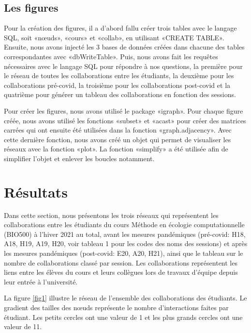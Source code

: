 \documentclass[12pt]{article}
\begin{document}
\subsection*{\small Les figures \vspace{-0.1cm}}
Pour la création des figures, il a d’abord fallu créer trois tables avec le langage SQL, soit «nœuds», «cours» et «collab», en utilisant «CREATE TABLE». Ensuite, nous avons injecté les 3 bases de données créées dans chacune des tables correspondantes avec «dbWriteTable». Puis, nous avons fait les requêtes nécessaires avec le langage SQL pour répondre à nos questions, la première pour le réseau de toutes les collaborations entre les étudiants, la deuxième pour les collaborations pré-covid, la troisième pour les collaborations post-covid et la quatrième pour générer un tableau des collaborations en fonction des sessions.
\par Pour créer les figures, nous avons utilisé le package «igraph». Pour chaque figure créée, nous avons utilisé les fonctions «subset» et «acast» pour créer des matrices carrées qui ont ensuite été utilisées dans la fonction «graph.adjacency». Avec cette dernière fonction, nous avons créé un objet qui permet de visualiser les réseaux avec la fonction «plot». La fonction «simplify» a été utilisée afin de simplifier l’objet et enlever les boucles notamment. 

\section*{\large Résultats\vspace{-0.1cm}}
Dans cette section, nous présentons les trois réseaux qui représentent les collaborations entre les étudiants du cours Méthode en écologie computationnelle (BIO500) à l’hiver 2021 au total, avant les mesures pandémiques (pré-covid: H18, A18, H19, A19, H20, voir tableau 1 pour les codes des noms des sessions) et après les mesures pandémiques (post-covid: E20, A20, H21), ainsi que le tableau sur le nombre de collaborations classé par session. Les collaborations représentent les liens entre les élèves du cours et leurs collègues lors de travaux d’équipe depuis leur entrée à l’université. 
\par La figure \ref{fig1} illustre le réseau de l’ensemble des collaborations des étudiants. Le gradient des tailles des nœuds représente le nombre d’interactions faites par étudiant. Les petits cercles ont une valeur de 1 et les plus grands cercles ont une valeur de 11. 
\end{document}
